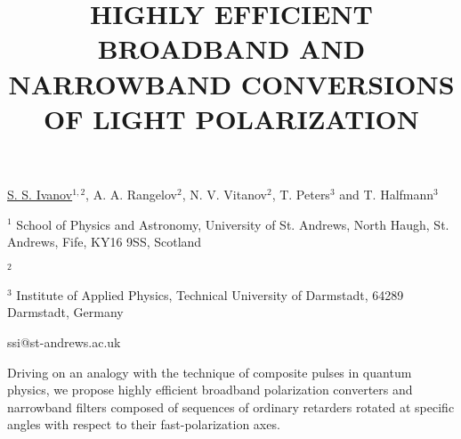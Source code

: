 \title{HIGHLY EFFICIENT BROADBAND AND NARROWBAND CONVERSIONS OF LIGHT POLARIZATION}

\underline{S. S. Ivanov}$^{1,2}$, A. A. Rangelov$^{2}$, N. V. Vitanov$^{2}$, T. Peters$^{3}$ and T. Halfmann$^{3}$

{\normalsize{
\vspace{-4mm} $^{1}$ School of Physics and Astronomy, University of St. Andrews, North Haugh, St. Andrews, Fife, KY16 9SS, Scotland

\vspace{-4mm} $^{2}$ \unisofia

\vspace{-4mm} $^{3}$ Institute of Applied Physics, Technical University of Darmstadt, 64289 Darmstadt, Germany

\email ssi@st-andrews.ac.uk}}

Driving on an analogy with the technique of composite pulses in quantum physics, we propose highly efficient broadband polarization converters and narrowband filters composed of sequences of ordinary retarders rotated at specific angles with respect to their fast-polarization axes.

\vspace{\baselineskip}